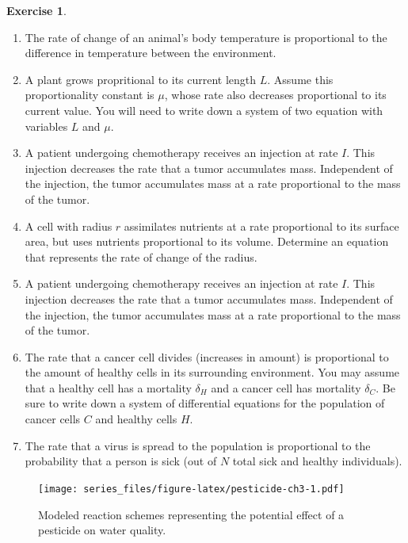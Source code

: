 \documentclass[
]{krantz}
\providecommand{\tightlist}{%
  \setlength{\itemsep}{0pt}\setlength{\parskip}{0pt}}
\theoremstyle{definition}
\theoremstyle{definition}
\theoremstyle{definition}
\newtheorem{exercise}{Exercise}[chapter]
\theoremstyle{definition}
\theoremstyle{remark}
\begin{document}
\begin{exercise}
\begin{enumerate}
\def\labelenumi{\alph{enumi}.}
\tightlist
\item
  The rate of change of an animal's body temperature is proportional to the difference in temperature between the environment.
\item
  A plant grows propritional to its current length \(L\). Assume this proportionality constant is \(\mu\), whose rate also decreases proportional to its current value. You will need to write down a system of two equation with variables \(L\) and \(\mu\).
\item
  A patient undergoing chemotherapy receives an injection at rate \(I\). This injection decreases the rate that a tumor accumulates mass. Independent of the injection, the tumor accumulates mass at a rate proportional to the mass of the tumor.
\item
  A cell with radius \(r\) assimilates nutrients at a rate proportional to its surface area, but uses nutrients proportional to its volume. Determine an equation that represents the rate of change of the radius.
\item
  A patient undergoing chemotherapy receives an injection at rate \(I\). This injection decreases the rate that a tumor accumulates mass. Independent of the injection, the tumor accumulates mass at a rate proportional to the mass of the tumor.
\item
  The rate that a cancer cell divides (increases in amount) is proportional to the amount of healthy cells in its surrounding environment. You may assume that a healthy cell has a mortality \(\delta_{H}\) and a cancer cell has mortality \(\delta_{C}\). Be sure to write down a system of differential equations for the population of cancer cells \(C\) and healthy cells \(H\).
\item
  The rate that a virus is spread to the population is proportional to the probability that a person is sick (out of \(N\) total sick and healthy individuals).
\end{enumerate}
\end{exercise}

\begin{figure}
\centering
\texttt{[image: series\_files/figure-latex/pesticide-ch3-1.pdf]}
\caption{\label{fig:pesticide-ch3}Modeled reaction schemes representing the potential effect of a pesticide on water quality.}
\end{figure}
\end{document}
